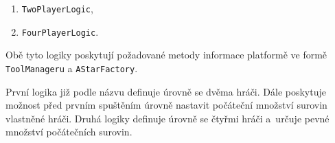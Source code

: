 \begin{enumerate}
	\item \texttt{TwoPlayerLogic},
	\item \texttt{FourPlayerLogic}.
\end{enumerate}

Obě tyto logiky poskytují požadované metody informace platformě ve formě \texttt{ToolManageru} a \texttt{AStarFactory}. 

První logika již podle názvu definuje úrovně se dvěma hráči. Dále poskytuje možnost před prvním spuštěním úrovně nastavit počáteční množství surovin vlastněné hráči.
Druhá logiky definuje úrovně se čtyřmi hráči a~určuje pevné množství počátečních surovin.
